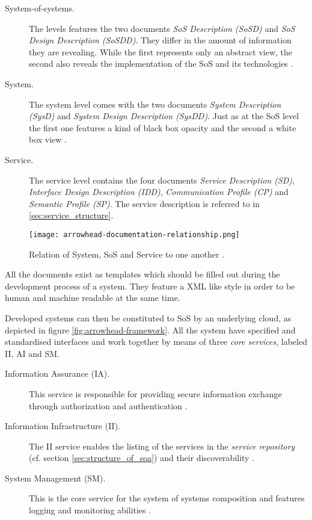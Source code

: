 \begin{description}
\item [System-of-systems.] The levels features the two documents \emph{SoS Description (SoSD)} and \emph{SoS Design Description (SoSDD)}. They differ in the amount of information they are revealing. While the first represents only an abstract view, the second also reveals the implementation of the SoS and its technologies \cite{arrowhead_inpr}.
\item [System.] The system level comes with the two documents \emph{System Description (SysD)} and \emph{System Design Description (SysDD)}. Just as at the SoS level the first one features a kind of black box opacity and the second a white box view \cite{arrowhead_inpr}.
\item [Service.] The service level contains the four documents \emph{Service Description (SD)}, \emph{Interface Design Description (IDD)}, \emph{Communication Profile (CP)} and \emph{Semantic Profile (SP)}. The service description is referred to in \ref{sec:service_structure}.
\end{description}

\begin{figure}[!htbp]
\centering
\texttt{[image: arrowhead-documentation-relationship.png]}
\caption{Relation of System, SoS and Service to one another \cite{arrowhead:presentation}.}
\label{fig:sys-arrowhead}
\end{figure}

All the documents exist as templates which should be filled out during the development process of a system. They feature a XML like style in order to be human and machine readable at the same time.

Developed systems can then be constituted to SoS by an underlying cloud, as depicted in figure \ref{fig:arrowhead-framework}. All the system have specified and standardised interfaces and work together by means of three \emph{core services}, labeled II, AI and SM.
\begin{description}
\item [Information Assurance (IA).]
This service is responsible for providing secure information exchange through authorization and authentication \cite{arrowhead:presentation}.
\item [Information Infrastructure (II).]
The II service enables the listing of the services in the \emph{service repository} (cf. section \ref{sec:structure_of_soa}) and their discoverability \cite{arrowhead:presentation}.
\item [System Management (SM).]
This is the core service for the system of systems composition and features logging and monitoring abilities \cite{arrowhead:presentation}.
\end{description}

